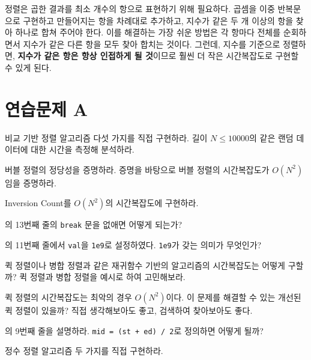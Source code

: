 정렬은 곱한 결과를 최소 개수의 항으로 표현하기 위해 필요하다. 곱셈을 이중 반복문으로 구현하고 만들어지는 항을 차례대로 추가하고, 지수가 같은 두 개 이상의 항을 찾아 하나로 합쳐 주어야 한다. 이를 해결하는 가장 쉬운 방법은 각 항마다 전체를 순회하면서 지수가 같은 다른 항을 모두 찾아 합치는 것이다. 그런데, 지수를 기준으로 정렬하면, \textbf{지수가 같은 항은 항상 인접하게 될 것}이므로 훨씬 더 작은 시간복잡도로 구현할 수 있게 된다.

\section{연습문제 A}
\begin{problem}
    비교 기반 정렬 알고리즘 다섯 가지를 직접 구현하라. 길이 $N \leq 10000$의 같은 랜덤 데이터에 대한 시간을 측정해 분석하라.
\end{problem}
\begin{problem} \label{pb: bubble-pf}
    버블 정렬의 정당성을 증명하라. 증명을 바탕으로 버블 정렬의 시간복잡도가 $O(N^2)$임을 증명하라.
\end{problem}
\begin{problem} \label{pb: inversion-square}
    Inversion Count를 $O(N^2)$의 시간복잡도에 구현하라.
\end{problem}
\begin{problem}
    의 13번째 줄의 \texttt{break} 문을 없애면 어떻게 되는가?
\end{problem}
\begin{problem}
    의 11번째 줄에서 \texttt{val}을 \texttt{1e9}로 설정하였다. \texttt{1e9}가 갖는 의미가 무엇인가?
\end{problem}
\begin{problem} \label{pb: quick-merge-time}
    퀵 정렬이나 병합 정렬과 같은 재귀함수 기반의 알고리즘의 시간복잡도는 어떻게 구할까? 퀵 정렬과 병합 정렬을 예시로 하여 고민해보라.
\end{problem}
\begin{problem}
    퀵 정렬의 시간복잡도는 최악의 경우 $O(N^2)$이다. 이 문제를 해결할 수 있는 개선된 퀵 정렬이 있을까? 직접 생각해보아도 좋고, 검색하여 찾아보아도 좋다.
\end{problem}
\begin{problem}
    의 9번째 줄을 설명하라. \texttt{mid = (st + ed) / 2}로 정의하면 어떻게 될까?
\end{problem}
\begin{problem}
    정수 정렬 알고리즘 두 가지를 직접 구현하라.
\end{problem}
